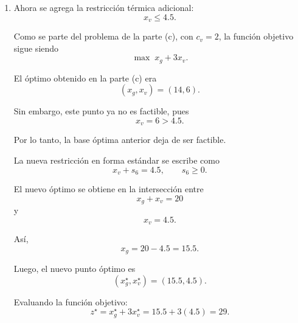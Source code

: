 \begin{enumerate}[label=\alph*)]
Así, la solución básica factible óptima es
\[
x^\star=
\begin{pmatrix}
x_g\\
x_v\\
s_1\\
s_2\\
s_3\\
s_4\\
s_5
\end{pmatrix}
=
\begin{pmatrix}
16\\
2\\
12\\
0\\
2\\
6\\
0
\end{pmatrix}.
\]

Comparando con la base óptima de la parte (c), se tiene que
\[
s_2 \text{ sale de la base},
\]
y
\[
s_3 \text{ entra a la base}.
\]

Por lo tanto, la nueva base óptima es
\[
\mathcal{B}=\{x_g,x_v,s_1,s_3,s_4\},
\]
mientras que las variables no básicas son
\[
\mathcal{N}=\{s_2,s_5\}.
\]

\item
Ahora se agrega la restricción térmica adicional:
\[
x_v \leq 4.5.
\]

Como se parte del problema de la parte (c), con \(c_v=2\), la función objetivo sigue siendo
\[
\max \; x_g+3x_v.
\]

El óptimo obtenido en la parte (c) era
\[
(x_g,x_v)=(14,6).
\]

Sin embargo, este punto ya no es factible, pues
\[
x_v=6>4.5.
\]

Por lo tanto, la base óptima anterior deja de ser factible.

La nueva restricción en forma estándar se escribe como
\[
x_v+s_6=4.5,
\qquad s_6\geq 0.
\]

El nuevo óptimo se obtiene en la intersección entre
\[
x_g+x_v=20
\]
y
\[
x_v=4.5.
\]

Así,
\[
x_g=20-4.5=15.5.
\]

Luego, el nuevo punto óptimo es
\[
(x_g^\star,x_v^\star)=(15.5,4.5).
\]

Evaluando la función objetivo:
\[
z^\star
=
x_g^\star+3x_v^\star
=
15.5+3(4.5)
=
29.
\]


\end{enumerate}
